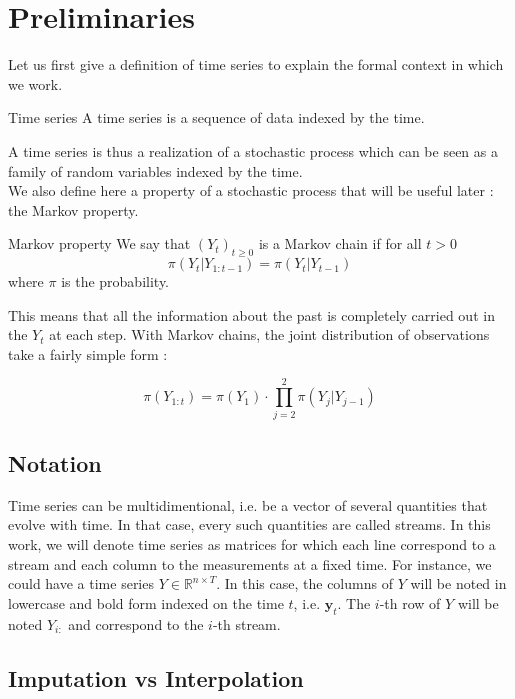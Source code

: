 \documentclass{article}
\begin{document}
\section{Preliminaries}
\label{prem}
Let us first give a definition of time series to explain the formal context in which we work. \\

\theoremstyle{definition}
\begin{definition}{Time series}
A time series is a sequence of data indexed by the time.
\end{definition}

A time series is thus a realization of a stochastic process which can be seen as a family of random variables indexed by the time. \\

We also define here a property of a stochastic process that will be useful later : the Markov property. \\

\theoremstyle{definition}
\begin{definition}{Markov property}
We say that $(Y_t)_{t \ge 0}$ is a Markov chain if for all $t > 0$
$$\pi(Y_t|Y_{1:t-1}) = \pi(Y_t|Y_{t-1})$$
where $\pi$ is the probability.
\end{definition}

This means that all the information about the past is completely carried out in the $Y_t$ at each step. With Markov chains, the joint distribution of observations take a fairly simple form :

$$\pi(Y_{1:t}) = \pi(Y_1) \cdot \prod_{j=2}^2 \pi(Y_j|Y_{j-1})$$

\subsection*{Notation}

Time series can be multidimentional, i.e. be a vector of several quantities that evolve with time. In that case, every such quantities are called streams. In this work, we will denote time series as matrices for which each line correspond to a stream and each column to the measurements at a fixed time. For instance, we could have a time series $Y \in \mathbb{R}^{n \times T}$. In this case, the columns of $Y$ will be noted in lowercase and bold form indexed on the time $t$, i.e. $\mathbf{y}_t$. The $i$-th row of $Y$ will be noted $Y_{i:}$ and correspond to the $i$-th stream.

\subsection*{Imputation vs Interpolation}
\end{document}
